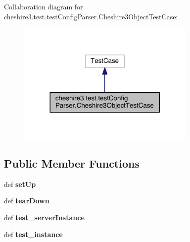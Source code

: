 Collaboration diagram for cheshire3.\-test.\-test\-Config\-Parser.\-Cheshire3\-Object\-Test\-Case\-:
\nopagebreak
\begin{figure}[H]
\begin{center}
\leavevmode
\includegraphics[width=246pt]{classcheshire3_1_1test_1_1test_config_parser_1_1_cheshire3_object_test_case__coll__graph}
\end{center}
\end{figure}
\subsection*{Public Member Functions}
\begin{DoxyCompactItemize}
\item 
\hypertarget{classcheshire3_1_1test_1_1test_config_parser_1_1_cheshire3_object_test_case_a5a71530c9bf385ab1e1893b99b5cb3a6}{def {\bfseries set\-Up}}\label{classcheshire3_1_1test_1_1test_config_parser_1_1_cheshire3_object_test_case_a5a71530c9bf385ab1e1893b99b5cb3a6}

\item 
\hypertarget{classcheshire3_1_1test_1_1test_config_parser_1_1_cheshire3_object_test_case_a8e324de57af423d942d917becd29d898}{def {\bfseries tear\-Down}}\label{classcheshire3_1_1test_1_1test_config_parser_1_1_cheshire3_object_test_case_a8e324de57af423d942d917becd29d898}

\item 
\hypertarget{classcheshire3_1_1test_1_1test_config_parser_1_1_cheshire3_object_test_case_a24ab7db579c4633788822c5272e53a58}{def {\bfseries test\-\_\-server\-Instance}}\label{classcheshire3_1_1test_1_1test_config_parser_1_1_cheshire3_object_test_case_a24ab7db579c4633788822c5272e53a58}

\item 
\hypertarget{classcheshire3_1_1test_1_1test_config_parser_1_1_cheshire3_object_test_case_a1ab33800b26f6e300d215a3c1e5152b1}{def {\bfseries test\-\_\-instance}}\label{classcheshire3_1_1test_1_1test_config_parser_1_1_cheshire3_object_test_case_a1ab33800b26f6e300d215a3c1e5152b1}

\end{DoxyCompactItemize}
